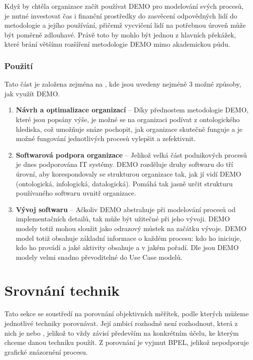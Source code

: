 \documentclass[]{article}
\begin{document}
Když by chtěla organizace začít používat DEMO pro modelování svých procesů, je nutné investovat čas i finanční prostředky do zasvěcení odpovědných lidí do metodologie a jejího používání, přičemž vycvičení lidí na potřebnou úroveň může být poměrně zdlouhavé. Právě toto by mohlo být jednou z hlavních překážek, které brání většímu rozšíření metodologie DEMO mimo akademickou půdu.

\subsubsection{Použití}
Tato část je založena zejména na \cite{Vejrazkova2012}, kde jsou uvedeny nejméně 3 možné způsoby, jak využít DEMO.

\begin{enumerate}
\item \textbf{Návrh a optimalizace organizací} – Díky přednostem metodologie DEMO, které jsou popsány výše, je možné se na organizaci podívat z ontologického hlediska, což umožňuje snáze pochopit, jak organizace skutečně funguje a je možné fungování jednotlivých procesů vylepšit a zefektivnit.
\item \textbf{Softwarová podpora organizace} – Jelikož velká část podnikových procesů je dnes podporována IT systémy. DEMO rozděluje druhy softwaru do tří úrovní, aby korespondovaly se strukturou organizace tak, jak jí vidí DEMO (ontologická, infologická, datalogická). Pomáhá tak jasně určit strukturu používaného softwaru uvnitř organizace. %
\item \textbf{Vývoj softwaru} – Ačkoliv DEMO abstrahuje při modelování procesů od implementačních detailů, tak může být užitečné při jeho vývoji. DEMO modely totiž mohou sloužit jako odrazový můstek na začátku vývoje. DEMO model totiž obsahuje základní informace o každém procesu: kdo ho iniciuje, kdo ho provádí a jaké aktivity obsahuje a v jakém pořadí. Dle \cite{Shishkov2005} jsou DEMO modely velmi snadno převoditelné do Use Case modelů.
\end{enumerate}


\section{Srovnání technik}
Tato sekce se soustředí na porovnání objektivních měřítek, podle kterých můžeme jednotlivé techniky porovnávat. Její ambicí rozhodně není rozhodnout, která z nich je  nebo , jelikož to vždy závisí především na konkrétním účelu, ke kterým chceme danou techniku použít. Z porovnání je vyjmut BPEL, jelikož nepodporuje grafické znázornění procesu.
\end{document}

